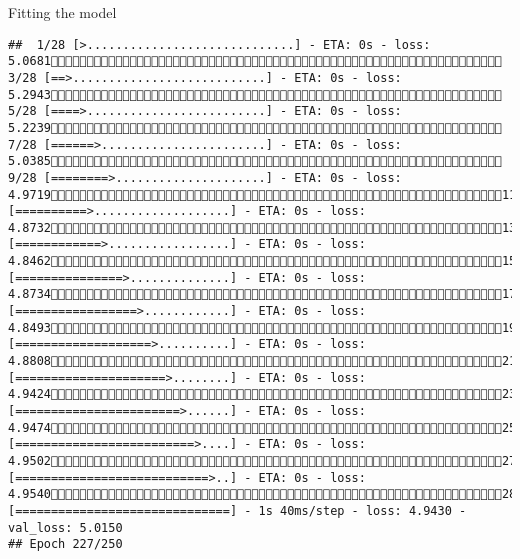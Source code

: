 \documentclass[
  ignorenonframetext,
]{beamer}
\begin{document}
\begin{frame}[fragile]{Fitting the model}
\begin{verbatim}
##  1/28 [>.............................] - ETA: 0s - loss: 5.0681 3/28 [==>...........................] - ETA: 0s - loss: 5.2943 5/28 [====>.........................] - ETA: 0s - loss: 5.2239 7/28 [======>.......................] - ETA: 0s - loss: 5.0385 9/28 [========>.....................] - ETA: 0s - loss: 4.971911/28 [==========>...................] - ETA: 0s - loss: 4.873213/28 [============>.................] - ETA: 0s - loss: 4.846215/28 [===============>..............] - ETA: 0s - loss: 4.873417/28 [=================>............] - ETA: 0s - loss: 4.849319/28 [===================>..........] - ETA: 0s - loss: 4.880821/28 [=====================>........] - ETA: 0s - loss: 4.942423/28 [=======================>......] - ETA: 0s - loss: 4.947425/28 [=========================>....] - ETA: 0s - loss: 4.950227/28 [===========================>..] - ETA: 0s - loss: 4.954028/28 [==============================] - 1s 40ms/step - loss: 4.9430 - val_loss: 5.0150
## Epoch 227/250

\end{verbatim}
\end{frame}
\end{document}
